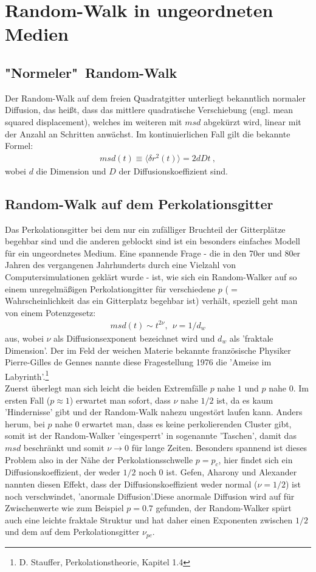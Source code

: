 \documentclass[a4paper, 12pt]{scrartcl}
\begin{document}
\section{Random-Walk in ungeordneten Medien}

\subsection{"Normeler"\ Random-Walk}
Der Random-Walk auf dem freien Quadratgitter unterliegt bekanntlich normaler Diffusion, das heißt, dass das mittlere quadratische Verschiebung (engl. mean squared displacement), welches im weiteren mit $msd$ abgekürzt wird, linear mit der Anzahl an Schritten anwächst. Im kontinuierlichen Fall gilt die bekannte Formel:
\begin{align*}
msd(t)\equiv \langle \delta r^2 (t) \rangle =2dDt\ ,
\end{align*}
wobei $d$ die Dimension und $D$ der Diffusionskoeffizient sind.

\subsection{Random-Walk auf dem Perkolationsgitter}
Das Perkolationsgitter bei dem nur ein zufälliger Bruchteil der Gitterplätze begehbar sind und die anderen geblockt sind ist ein besonders einfaches Modell für ein ungeordnetes Medium. Eine spannende Frage - die in den 70er und 80er Jahren des vergangenen Jahrhunderts durch eine Vielzahl von Computersimulationen geklärt wurde - ist, wie sich ein Random-Walker auf so einem unregelmäßigen Perkolationgitter für verschiedene $p$ ($=$ Wahrscheinlichkeit das ein Gitterplatz begehbar ist) verhält, speziell geht man von einem Potenzgesetz:
\begin{align*}
msd(t) \sim t^{2 \nu},\ \ \nu=1/d_w
\end{align*} 
aus, wobei $\nu$ als Diffusionsexponent bezeichnet wird und $d_w$ als 'fraktale Dimension'. Der im Feld der weichen Materie bekannte französische Physiker Pierre-Gilles de Gennes nannte diese Fragestellung 1976 die 'Ameise im Labyrinth'.\footnote{D. Stauffer, Perkolationstheorie, Kapitel 1.4} 
\\ 
\noindent Zuerst überlegt man sich leicht die beiden Extremfälle $p$ nahe $1$ und $p$ nahe $0$. Im ersten Fall ($p \approx 1$) erwartet man sofort, dass $\nu$ nahe $1/2$ ist, da es kaum 'Hindernisse' gibt und der Random-Walk nahezu ungestört laufen kann. Anders herum, bei $p$ nahe $0$ erwartet man, dass es keine perkolierenden Cluster gibt, somit ist der Random-Walker 'eingesperrt' in sogenannte 'Taschen', damit das $msd$ beschränkt und somit $\nu \rightarrow 0$ für lange Zeiten. Besonders spannend ist dieses Problem also in der Nähe der Perkolationsschwelle $p=p_c$, hier findet sich ein Diffusionskoeffizient, der weder $1/2$ noch $0$ ist. Gefen, Aharony und Alexander nannten diesen Effekt, dass der Diffusionskoeffizient weder normal  ($\nu = 1/2$) ist noch verschwindet, 'anormale Diffusion'.\footnotemark[6] Diese anormale Diffusion wird auf für Zwischenwerte wie zum Beispiel $p=0.7$ gefunden, der Random-Walker spürt auch eine leichte fraktale Struktur und hat daher einen Exponenten zwischen $1/2$ und dem auf dem Perkolationsgitter $\nu_{pc}$.
\end{document}
